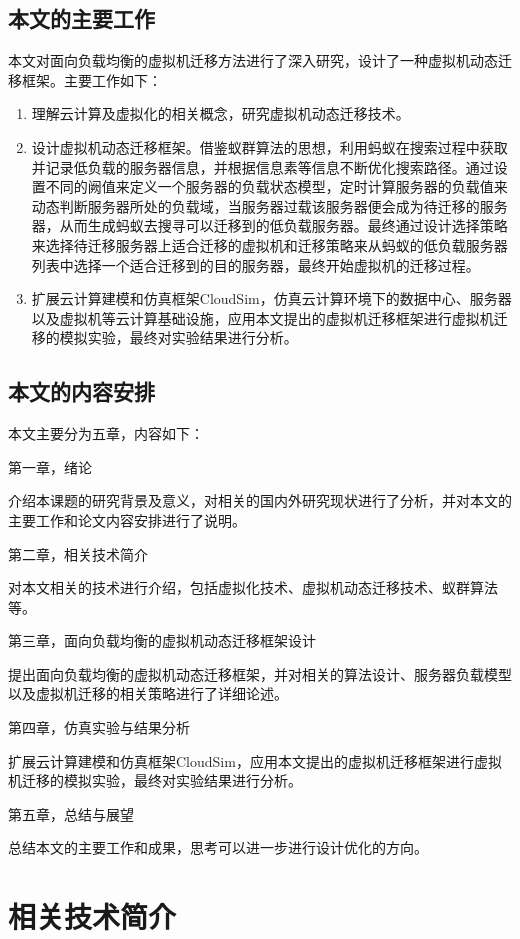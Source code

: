 \section{本文的主要工作}
本文对面向负载均衡的虚拟机迁移方法进行了深入研究，设计了一种虚拟机动态迁移框架。主要工作如下：
\begin{enumerate}
    \item 理解云计算及虚拟化的相关概念，研究虚拟机动态迁移技术。
    \item 设计虚拟机动态迁移框架。借鉴蚁群算法的思想，利用蚂蚁在搜索过程中获取并记录低负载的服务器信息，并根据信息素等信息不断优化搜索路径。通过设置不同的阙值来定义一个服务器的负载状态模型，定时计算服务器的负载值来动态判断服务器所处的负载域，当服务器过载该服务器便会成为待迁移的服务器，从而生成蚂蚁去搜寻可以迁移到的低负载服务器。最终通过设计选择策略来选择待迁移服务器上适合迁移的虚拟机和迁移策略来从蚂蚁的低负载服务器列表中选择一个适合迁移到的目的服务器，最终开始虚拟机的迁移过程。
    \item 扩展云计算建模和仿真框架CloudSim，仿真云计算环境下的数据中心、服务器以及虚拟机等云计算基础设施，应用本文提出的虚拟机迁移框架进行虚拟机迁移的模拟实验，最终对实验结果进行分析。
\end{enumerate}

\section{本文的内容安排}
本文主要分为五章，内容如下：

第一章，绪论

介绍本课题的研究背景及意义，对相关的国内外研究现状进行了分析，并对本文的主要工作和论文内容安排进行了说明。

第二章，相关技术简介

对本文相关的技术进行介绍，包括虚拟化技术、虚拟机动态迁移技术、蚁群算法等。

第三章，面向负载均衡的虚拟机动态迁移框架设计

提出面向负载均衡的虚拟机动态迁移框架，并对相关的算法设计、服务器负载模型以及虚拟机迁移的相关策略进行了详细论述。

第四章，仿真实验与结果分析

扩展云计算建模和仿真框架CloudSim，应用本文提出的虚拟机迁移框架进行虚拟机迁移的模拟实验，最终对实验结果进行分析。

第五章，总结与展望

总结本文的主要工作和成果，思考可以进一步进行设计优化的方向。

\chapter{相关技术简介}

